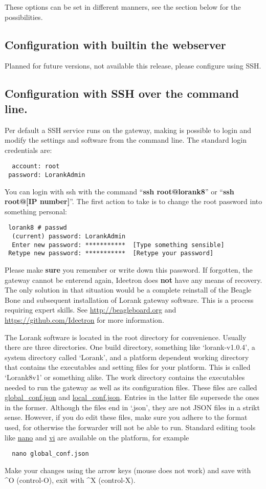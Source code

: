\documentclass[12pt]{article}
\begin{document}
\larger[2]
 
These options can be set in different manners, see the section below for the possibilities. 

\subsection{Configuration with builtin the webserver}
Planned for future versions, not available this release, please configure using SSH. 

\subsection{Configuration with SSH over the command line.}
Per default a SSH service runs on the gateway, making is possible to login and modify the 
settings and software from the command line. The standard login credentials are:
\begin{verbatim}
  account: root
 password: LorankAdmin
\end{verbatim}
You can login with ssh with the command ``{\bf ssh root@lorank8}'' or ``{\bf ssh root@[IP number]}''.
The first action to take is to change the root password into something personal:
\begin{verbatim}
 lorank8 # passwd 
  (current) password: LorankAdmin
  Enter new password: ***********  [Type something sensible]
 Retype new password: ***********  [Retype your password] 
\end{verbatim}
Please make {\bf sure} you remember or write down this password. If forgotten, the gateway
cannot be enterend again, Ideetron does {\bf not} have any means of recovery. 
The only solution in that situation would be a complete 
reinstall of the Beagle Bone and subsequent installation of Lorank gateway 
software. This is a process requiring expert skills. See \url{http://beagleboard.org} 
and \url{https://github.com/Ideetron} for more information.

The Lorank software is located in the root directory for convenience. Usually there are
three directories. One build directory, something like `lorank-v1.0.4', a system directory
called `Lorank', and a platform dependent working directory that contains the executables and
setting files for your platform. This is called `Lorank8v1' or something alike. The work
directory contains the executables needed to run the gateway as well as its configuration files.
These files are called \url{global_conf.json} and \url{local_conf.json}. Entries in the
latter file supersede the ones in the former. Although the files end in `.json', they are
not JSON files in a strikt sense. However, if you do edit these files, make sure you
adhere to the format used, for otherwise the forwarder will not be able to run.
Standard editing tools like \url{nano} and \url{vi} are available on the platform,
for example
\begin{verbatim}
  nano global_conf.json
\end{verbatim}
Make your changes using the arrow keys (mouse does not work) and save with \^{}O
(control-O), exit with \^{}X (control-X).
\end{document}
